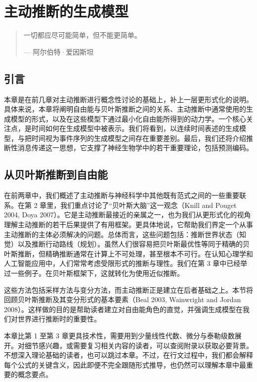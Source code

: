 \chapter{主动推断的生成模型}

\begin{quote}
一切都应尽可能简单，但不能更简单。

\hfill --- 阿尔伯特·爱因斯坦
\end{quote}

\section{引言}

本章是在前几章对主动推断进行概念性讨论的基础上，补上一层更形式化的说明。具体来说，本章将阐明自由能与贝叶斯推断之间的关系、主动推断中通常使用的生成模型的形式，以及在这些模型下通过最小化自由能所得到的动力学。一个核心关注点，是时间如何在生成模型中被表示。我们将看到，以连续时间表述的生成模型，与把时间视为事件序列的生成模型之间存在重要差别。最后，我们还将介绍推断性消息传递这一思想，它支撑了神经生物学中的若干重要理论，包括预测编码。

\section{从贝叶斯推断到自由能}

在前两章中，我们概述了主动推断与神经科学中其他既有范式之间的一些重要联系。在第 2 章里，我们重点讨论了“贝叶斯大脑”这一观念（Knill and Pouget 2004, Doya 2007）。它是主动推断最接近的亲属之一，也为我们从更形式化的视角理解主动推断的若干后果提供了有用框架。更具体地说，它帮助我们界定一个从事主动推断的主体必须解决的问题。总体而言，这些问题包括：推断世界状态（知觉）以及推断行动路线（规划）。虽然人们很容易把贝叶斯最优性等同于精确的贝叶斯推断，但精确推断通常在计算上不可处理，甚至根本不可行。在认知心理学和人工智能应用中，人们常常考虑受限形式的推断与理性。我们在第 3 章中已经举过一些例子。在贝叶斯框架下，这就转化为使用近似推断。

这些方法包括采样方法与变分方法，而主动推断正是建立在后者基础之上。本节将回顾贝叶斯推断及其变分形式的基本要素（Beal 2003, Wainwright and Jordan 2008）。这样做的目的是帮助读者建立对自由能角色的直觉，并强调生成模型在我们对世界进行推断时的重要性。

本章比第 1 至第 3 章更具技术性，需要用到少量线性代数、微分与泰勒级数展开。对细节感兴趣，或需要复习相关内容的读者，可以查阅附录以获取必要背景。不想深入理论基础的读者，也可以跳过本章。不过，在行文过程中，我们都会解释每个公式的关键含义，因此即便不完全跟随形式推导，也仍然可以理解本章中最重要的概念要点。


